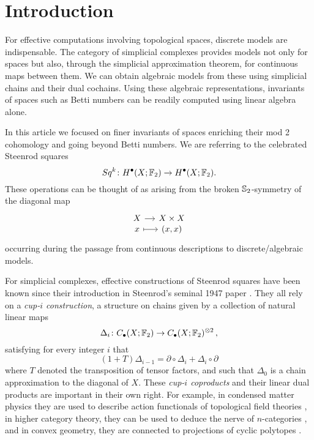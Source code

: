 
\section{Introduction}

For effective computations involving topological spaces, discrete models are indispensable.
The category of simplicial complexes provides models not only for spaces but also, through the simplicial approximation theorem, for continuous maps between them.
We can obtain algebraic models from these using simplicial chains and their dual cochains.
Using these algebraic representations, invariants of spaces such as Betti numbers can be readily computed using linear algebra alone.

In this article we focused on finer invariants of spaces enriching their mod 2 cohomology and going beyond Betti numbers.
We are referring to the celebrated Steenrod squares
\begin{equation*}
Sq^k \colon H^\bullet(X; {\mathbb{F}_2}) \to H^\bullet(X; {\mathbb{F}_2}).
\end{equation*}
These operations can be thought of as arising from the broken $\mathbb{S}_2$-symmetry of the diagonal map
\begin{equation*}
\begin{tikzcd}[column sep=small, row sep=-3pt]
X \arrow[r] & X \times X \\
x \arrow[r, mapsto] & (x,x)
\end{tikzcd}
\end{equation*}
occurring during the passage from continuous descriptions to discrete/algebraic models.

For simplicial complexes, effective constructions of Steenrod squares have been known since their introduction in Steenrod's seminal 1947 paper \cite{steenrod1947products}.
They all rely on a \textit{cup-$i$ construction}, a structure on chains given by a collection of natural linear maps
\begin{equation*}
\Delta_i \colon C_\bullet(X; {\mathbb{F}_2})  \to C_\bullet(X; {\mathbb{F}_2})^{\otimes 2}\,,
\end{equation*}
satisfying for every integer $i$ that
\begin{equation*}
(1+T) \Delta_{i-1} =
\partial \circ \Delta_i + \Delta_i \circ \partial
\end{equation*}
where $T$ denoted the transposition of tensor factors,
and such that $\Delta_0$ is a chain approximation to the diagonal of $X$.
These \textit{cup-$i$ coproducts} and their linear dual products are important in their own right.
For example, in condensed matter physics they are used to describe action functionals of topological field theories \cite{gaiotto2016spin, bhardwaj2017state, kapustin2017fermionic}, in higher category theory, they can be used to deduce the nerve of $n$-categories \cite{medina2020globular}, and in convex geometry, they are connected to projections of cyclic polytopes \cite{kapranov1991combinatorial}.

